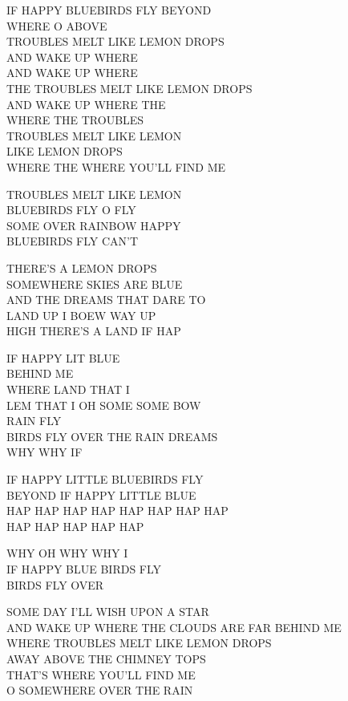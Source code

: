 IF HAPPY BLUEBIRDS FLY BEYOND\\
WHERE O ABOVE\\
TROUBLES MELT LIKE LEMON DROPS\\
AND WAKE UP WHERE\\
AND WAKE UP WHERE\\
THE TROUBLES MELT LIKE LEMON DROPS\\
AND WAKE UP WHERE THE\\
WHERE THE TROUBLES\\
TROUBLES MELT LIKE LEMON\\
LIKE LEMON DROPS\\
WHERE THE WHERE YOU'LL FIND ME\par

TROUBLES MELT LIKE LEMON\\
BLUEBIRDS FLY O FLY\\
SOME OVER RAINBOW HAPPY\\
BLUEBIRDS FLY CAN'T\par

THERE'S A LEMON DROPS\\
SOMEWHERE SKIES ARE BLUE\\
AND THE DREAMS THAT DARE TO\\
LAND UP I BOEW WAY UP\\
HIGH THERE'S A LAND IF HAP\par

IF HAPPY LIT BLUE\\
BEHIND ME\\
WHERE LAND THAT I\\
LEM THAT I OH SOME SOME BOW\\
RAIN FLY\\
BIRDS FLY OVER THE RAIN DREAMS\\
WHY WHY IF\par

IF HAPPY LITTLE BLUEBIRDS FLY\\
BEYOND IF HAPPY LITTLE BLUE\\
HAP HAP HAP HAP HAP HAP HAP HAP\\
HAP HAP HAP HAP HAP\par

WHY OH WHY WHY I\\
IF HAPPY BLUE BIRDS FLY\\
BIRDS FLY OVER\par

SOME DAY I'LL WISH UPON A STAR\\
AND WAKE UP WHERE THE CLOUDS ARE FAR BEHIND ME\\
WHERE TROUBLES MELT LIKE LEMON DROPS\\
AWAY ABOVE THE CHIMNEY TOPS\\
THAT'S WHERE YOU'LL FIND ME\\
O SOMEWHERE OVER THE RAIN\par

